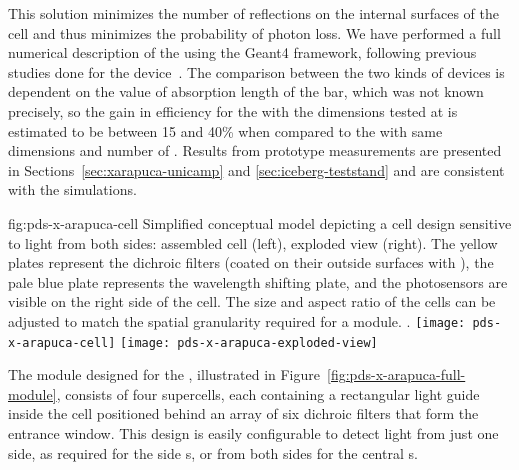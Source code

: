 This solution minimizes the number of reflections on the internal surfaces of the cell and thus minimizes the probability of photon loss. 
We have performed a full numerical description of the  using the Geant4 framework, following previous studies done for the  device~\cite{Marinho:2018doi}.  The comparison between the two kinds of devices is dependent on the value of absorption length of the bar, which was not known precisely, so the gain in efficiency for the  with the dimensions tested at  is estimated to be between 15 and 40\% when compared to the  with same dimensions and number of .
Results from prototype measurements are presented in Sections~\ref{sec:xarapuca-unicamp} and \ref{sec:iceberg-teststand} and are consistent with the simulations.

 \begin{dunefigure}{fig:pds-x-arapuca-cell}
{Simplified conceptual model depicting a  cell design sensitive to light from both sides: assembled cell (left),  exploded view (right). The yellow plates represent the dichroic filters (coated on their outside surfaces with  ), the pale blue plate represents the wavelength shifting plate, and the photosensors are visible on the right side of the cell. The size and aspect ratio of the cells can be adjusted to match the spatial granularity required for a  module. .
} 
  \texttt{[image: pds-x-arapuca-cell]}
  \texttt{[image: pds-x-arapuca-exploded-view]}
\end{dunefigure}

The   module designed for the  , illustrated in Figure~\ref{fig:pds-x-arapuca-full-module}, consists of four supercells, each containing a rectangular 
light guide inside the cell positioned behind an array of six dichroic filters that form the entrance window.  
This design is easily configurable to detect light from just one side, as required for the side s, or from both sides for the central s. 

